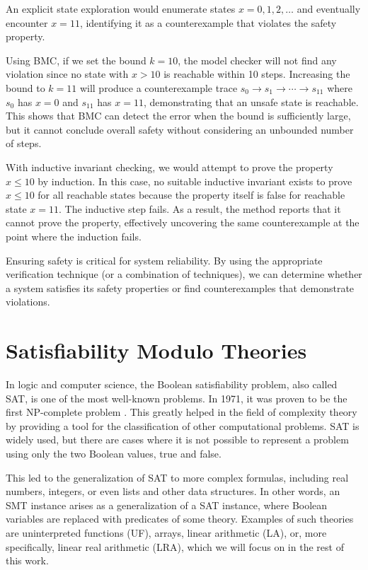 An explicit state exploration would enumerate states $x = 0, 1, 2, \dots$ and eventually encounter $x = 11$, identifying it as a counterexample that violates the safety property. 

Using BMC, if we set the bound $k = 10$, the model checker will not find any violation since no state with $x>10$ is reachable within 10 steps. Increasing the bound to $k = 11$ will produce a counterexample trace $s_0 \to s_1 \to \cdots \to s_{11}$ where $s_0$ has $x=0$ and $s_{11}$ has $x=11$, demonstrating that an unsafe state is reachable. This shows that BMC can detect the error when the bound is sufficiently large, but it cannot conclude overall safety without considering an unbounded number of steps.

With inductive invariant checking, we would attempt to prove the property $x \le 10$ by induction. In this case, no suitable inductive invariant exists to prove $x \le 10$ for all reachable states because the property itself is false for reachable state $x=11$. The inductive step fails. As a result, the method reports that it cannot prove the property, effectively uncovering the same counterexample at the point where the induction fails.

Ensuring safety is critical for system reliability. By using the appropriate verification technique (or a combination of techniques), we can determine whether a system satisfies its safety properties or find counterexamples that demonstrate violations.


\section{Satisfiability Modulo Theories\cite{BarFT-SMTLIB}}
\noindent In logic and computer science, the Boolean satisfiability problem, also called SAT, is one of the most well-known problems. In 1971, it was proven to be the first NP-complete problem \cite{10.1145/800157.805047}. This greatly helped in the field of complexity theory by providing a tool for the classification of other computational problems. SAT is widely used, but there are cases where it is not possible to represent a problem using only the two Boolean values, true and false.

This led to the generalization of SAT to more complex formulas, including real numbers, integers, or even lists and other data structures. In other words, an SMT instance arises as a generalization of a SAT instance, where Boolean variables are replaced with predicates of some theory. Examples of such theories are uninterpreted functions (UF), arrays, linear arithmetic (LA), or, more specifically, linear real arithmetic (LRA), which we will focus on in the rest of this work.

